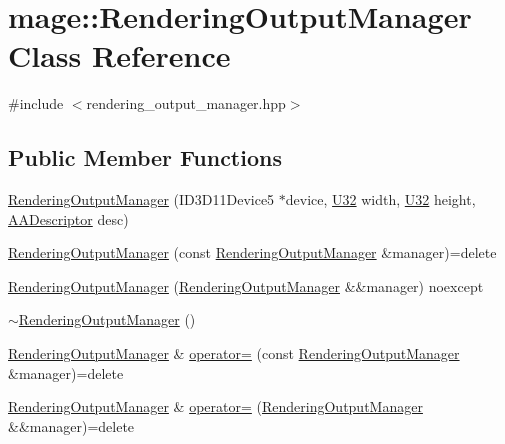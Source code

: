 \hypertarget{classmage_1_1_rendering_output_manager}{}\section{mage\+:\+:Rendering\+Output\+Manager Class Reference}
\label{classmage_1_1_rendering_output_manager}


{\ttfamily \#include $<$rendering\+\_\+output\+\_\+manager.\+hpp$>$}

\subsection*{Public Member Functions}
\begin{DoxyCompactItemize}
\item 
\hyperlink{classmage_1_1_rendering_output_manager_acbf3f32fdfaeb97e100c07b2197fe0b7}{Rendering\+Output\+Manager} (I\+D3\+D11\+Device5 $\ast$device, \hyperlink{namespacemage_a41c104c036fba3756a74e19f793eeaa1}{U32} width, \hyperlink{namespacemage_a41c104c036fba3756a74e19f793eeaa1}{U32} height, \hyperlink{namespacemage_a0b400065340fa5cca0ce4c2809d91af1}{A\+A\+Descriptor} desc)
\item 
\hyperlink{classmage_1_1_rendering_output_manager_acd8d30bacabd163e75d5d1dfdaf13976}{Rendering\+Output\+Manager} (const \hyperlink{classmage_1_1_rendering_output_manager}{Rendering\+Output\+Manager} \&manager)=delete
\item 
\hyperlink{classmage_1_1_rendering_output_manager_a39421535b27a270a759cb1f9d171435f}{Rendering\+Output\+Manager} (\hyperlink{classmage_1_1_rendering_output_manager}{Rendering\+Output\+Manager} \&\&manager) noexcept
\item 
\hyperlink{classmage_1_1_rendering_output_manager_ac6c1b4ce353870ea603982623962b2f4}{$\sim$\+Rendering\+Output\+Manager} ()
\item 
\hyperlink{classmage_1_1_rendering_output_manager}{Rendering\+Output\+Manager} \& \hyperlink{classmage_1_1_rendering_output_manager_ab31c30892c950603e39208a918ac9d49}{operator=} (const \hyperlink{classmage_1_1_rendering_output_manager}{Rendering\+Output\+Manager} \&manager)=delete
\item 
\hyperlink{classmage_1_1_rendering_output_manager}{Rendering\+Output\+Manager} \& \hyperlink{classmage_1_1_rendering_output_manager_a491a7ef504f7ff8292fddeca7efdb130}{operator=} (\hyperlink{classmage_1_1_rendering_output_manager}{Rendering\+Output\+Manager} \&\&manager)=delete
\item 

\end{DoxyCompactItemize}

